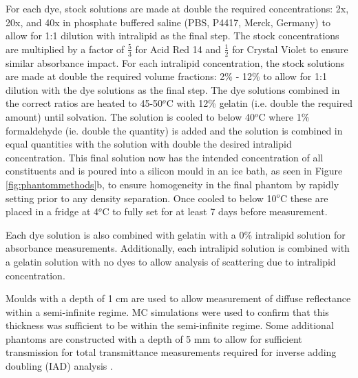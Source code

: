\label{sec:methodsphantomsynthesis}
For each dye, stock solutions are made at double the required concentrations: 2x, 20x, and 40x in phosphate buffered saline (PBS, P4417, Merck, Germany) to allow for 1:1 dilution with intralipid as the final step. The stock concentrations are multiplied by a factor of $\frac{5}{3}$ for Acid Red 14 and $\frac{1}{2}$ for Crystal Violet to ensure similar absorbance impact. For each intralipid concentration, the stock solutions are made at double the required volume fractions: 2\% - 12\% to allow for 1:1 dilution with the dye solutions as the final step. The dye solutions combined in the correct ratios are heated to 45-50$^o$C with 12\% gelatin (i.e. double the required amount) until solvation. The solution is cooled to below 40$^o$C where 1\% formaldehyde (ie. double the quantity) is added and the solution is combined in equal quantities with the solution with double the desired intralipid concentration. This final solution now has the intended concentration of all constituents and is poured into a silicon mould in an ice bath, as seen in Figure \ref{fig:phantommethods}b, to ensure homogeneity in the final phantom by rapidly setting prior to any density separation. Once cooled to below 10$^o$C these are placed in a fridge at 4$^o$C to fully set for at least 7 days before measurement. 

Each dye solution is also combined with gelatin with a 0\% intralipid solution for absorbance measurements.
Additionally, each intralipid solution is combined with a gelatin solution with no dyes to allow analysis of scattering due to intralipid concentration.

Moulds with a depth of 1 cm are used to allow measurement of diffuse reflectance within a semi-infinite regime\cite{Zhang2014}.
MC simulations were used to confirm that this thickness was sufficient to be within the semi-infinite regime.
Some additional phantoms are constructed with a depth of 5 mm to allow for sufficient transmission for total transmittance measurements required for inverse adding doubling (IAD) analysis \cite{Prahl2017}. 



